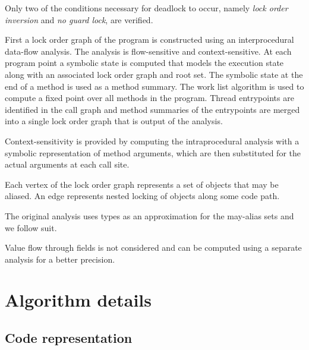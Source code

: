 Only two of the conditions necessary for deadlock to occur, namely \emph{lock order inversion} and \emph{no guard lock}, are verified. 

First a lock order graph of the program is constructed using an interprocedural data-flow analysis. The analysis is flow-sensitive and context-sensitive. At each program point a symbolic state is computed that models the execution state along with an associated lock order graph and root set. The symbolic state at the end of a method is used as a method summary. The work list algorithm is used to compute a fixed point over all methods in the program. Thread entrypoints are identified in the call graph and method summaries of the entrypoints are merged into a single lock order graph that is output of the analysis.

Context-sensitivity is provided by computing the intraprocedural analysis with a symbolic representation of method arguments, which are then substituted for the actual arguments at each call site.

Each vertex of the lock order graph represents a set of objects that may be aliased. An edge represents nested locking of objects along some code path.

The original analysis uses types as an approximation for the may-alias sets and we follow suit.

Value flow through fields is not considered and can be computed using a separate analysis for a better precision.

\section{Algorithm details}

\subsection{Code representation}

